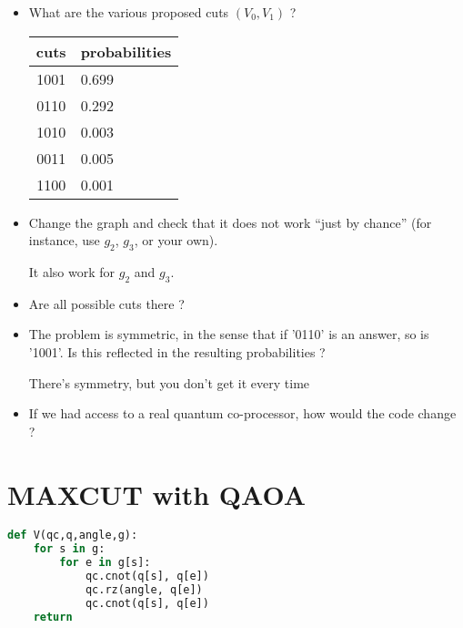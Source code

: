 \documentclass{article}
\theoremstyle{plain}
\begin{document}
  \begin{itemize}
    \item What are the various proposed cuts $(V_{0},V_{1})$ ?

      \begin{center}
      \begin{tabular}{c|l}
        cuts & probabilities \\ \hline
        1001 & 0.699  \\
        0110 & 0.292 \\
        1010 & 0.003 \\
        0011 & 0.005 \\
        1100 & 0.001 \\

      \end{tabular}
      \end{center}

    \item Change the graph and check that it does not work ``just by chance''
      (for instance, use $g_2$, $g_3$, or your own).

      It also work for $g_2$ and $g_3$.

    \item Are all possible cuts there ?

    \item The problem is symmetric, in the sense that if '0110' is an answer,
      so is '1001'. Is this reflected in the resulting probabilities ?

      There's symmetry, but you don't get it every time

    \item If we had access to a real quantum co-processor, how would the
      code change ?

  \end{itemize}

  \section{MAXCUT with QAOA}

  \begin{lstlisting}[language=python, label=code:VQE,
                     caption=code that add V gate in a quantum circuit]
def V(qc,q,angle,g):
    for s in g:
        for e in g[s]:
            qc.cnot(q[s], q[e])
            qc.rz(angle, q[e])
            qc.cnot(q[s], q[e])
    return\end{lstlisting}
\end{document}
